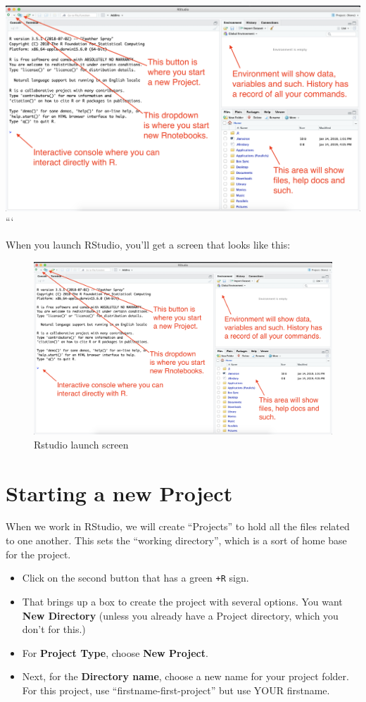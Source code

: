 \documentclass[]{book}
\providecommand{\tightlist}{%
  \setlength{\itemsep}{0pt}\setlength{\parskip}{0pt}}
\begin{document}
\includegraphics[width=0.5\linewidth]{_images/02-rstudio-start} ```

When you launch RStudio, you'll get a screen that looks like this:

\begin{figure}
\centering
\includegraphics[width=6.25000in]{_images/02-rstudio-start.png}
\caption{Rstudio launch screen}
\end{figure}

\section{Starting a new Project}\label{starting-a-new-project}

When we work in RStudio, we will create ``Projects'' to hold all the
files related to one another. This sets the ``working directory'', which
is a sort of home base for the project.

\begin{itemize}
\tightlist
\item
  Click on the second button that has a green \texttt{+R} sign.
\item
  That brings up a box to create the project with several options. You
  want \textbf{New Directory} (unless you already have a Project
  directory, which you don't for this.)
\item
  For \textbf{Project Type}, choose \textbf{New Project}.
\item
  Next, for the \textbf{Directory name}, choose a new name for your
  project folder. For this project, use ``firstname-first-project'' but
  use YOUR firstname.
\end{itemize}
\end{document}
